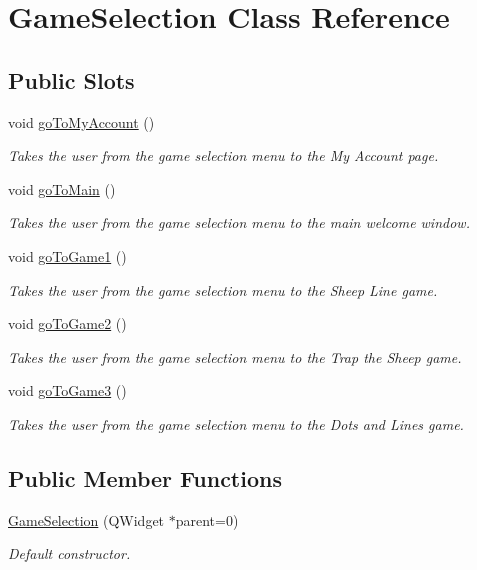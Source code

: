 \hypertarget{classGameSelection}{\section{\-Game\-Selection \-Class \-Reference}
\label{classGameSelection}
}
\subsection*{\-Public \-Slots}
\begin{DoxyCompactItemize}
\item 
void \hyperlink{classGameSelection_ac05fa74d67c03407e532fb627eaafd37}{go\-To\-My\-Account} ()
\begin{DoxyCompactList}\small\item\em \-Takes the user from the game selection menu to the \-My \-Account page. \end{DoxyCompactList}\item 
void \hyperlink{classGameSelection_a9c137b0feaa79fa0be575e71fe12f60b}{go\-To\-Main} ()
\begin{DoxyCompactList}\small\item\em \-Takes the user from the game selection menu to the main welcome window. \end{DoxyCompactList}\item 
void \hyperlink{classGameSelection_a94882519629ecb0344fec9e0d8e1a66b}{go\-To\-Game1} ()
\begin{DoxyCompactList}\small\item\em \-Takes the user from the game selection menu to the \-Sheep \-Line game. \end{DoxyCompactList}\item 
void \hyperlink{classGameSelection_a2836cb7f7290727491a4843a191cb9b2}{go\-To\-Game2} ()
\begin{DoxyCompactList}\small\item\em \-Takes the user from the game selection menu to the \-Trap the \-Sheep game. \end{DoxyCompactList}\item 
void \hyperlink{classGameSelection_a6aa089b1aca3b4cbabe883c920e89c6f}{go\-To\-Game3} ()
\begin{DoxyCompactList}\small\item\em \-Takes the user from the game selection menu to the \-Dots and \-Lines game. \end{DoxyCompactList}\end{DoxyCompactItemize}
\subsection*{\-Public \-Member \-Functions}
\begin{DoxyCompactItemize}
\item 
\hyperlink{classGameSelection_a695a14c5e70115c79bd4f5d701b38f1f}{\-Game\-Selection} (\-Q\-Widget $\ast$parent=0)
\begin{DoxyCompactList}\small\item\em \-Default constructor. \end{DoxyCompactList}\end{DoxyCompactItemize}


